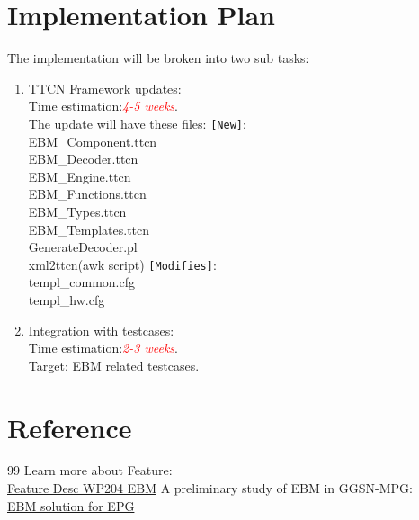 \documentclass[a4paper,11pt]{article}
\begin{document}
\section{Implementation Plan}
The implementation will be broken into two sub tasks:\\
\flushleft
\begin{enumerate}
\item TTCN Framework updates:\\
Time estimation:\textcolor{red}{\emph{4-5 weeks}}.\\
The update will have these files:
\newline \texttt{[New]}:\\
EBM\_Component.ttcn\\
EBM\_Decoder.ttcn\\
EBM\_Engine.ttcn\\
EBM\_Functions.ttcn\\
EBM\_Types.ttcn\\
EBM\_Templates.ttcn\\
GenerateDecoder.pl\\
xml2ttcn(awk script)
\newline \texttt{[Modifies]}:\\
templ\_common.cfg\\
templ\_hw.cfg
\item Integration with testcases:\\
Time estimation:\textcolor{red}{\emph{2-3 weeks}}.\\
Target: EBM related testcases. 
\end{enumerate}
\section{Reference}
\begin {thebibliography}{99}
 Learn more about Feature:\\
\href{http://cdmweb.ericsson.se/WEBLINK/ViewDocs?DocumentName=316\%2F0363-1\%2FFCP111392\&Latest=true}{Feature Desc WP204 EBM}
 A preliminary study of EBM in GGSN-MPG:\\
\href{http://cdmweb.ericsson.se/WEBLINK/ViewDocs?DocumentName=EAB\%2FFBA\%2FG-10\%3A0201\&Latest=true}{EBM solution for EPG}
\end{thebibliography}
\end{document}
